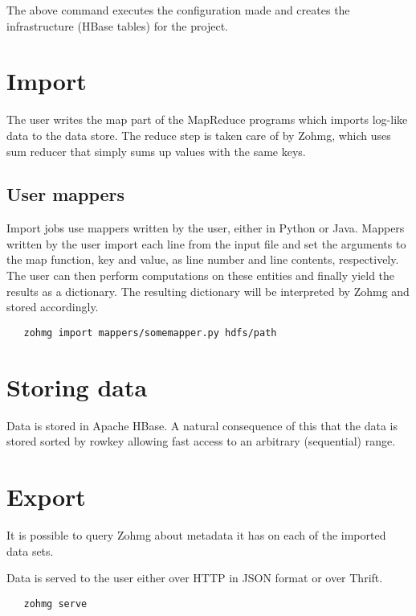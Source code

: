 \documentclass[a4paper,10pt]{book}
\begin{document}
\noindent The above command executes the configuration made and creates the
infrastructure (HBase tables) for the project.


\section{Import}

The user writes the map part of the MapReduce programs which imports
log-like data to the data store. The reduce step is taken care of by Zohmg,
which uses sum reducer that simply sums up values with the same keys.


\subsection{User mappers}

Import jobs use mappers written by the user, either in Python or Java.
Mappers written by the user import each line from the input file and set
the arguments to the map function, key and value, as line number and line
contents, respectively. The user can then perform computations on these
entities and finally yield the results as a dictionary. The resulting
dictionary will be interpreted by Zohmg and stored accordingly.

\begin{verbatim}
   zohmg import mappers/somemapper.py hdfs/path
\end{verbatim}


\section{Storing data}

Data is stored in Apache HBase. A natural consequence of this that the
data is stored sorted by rowkey allowing fast access to an arbitrary
(sequential) range.



\section{Export}

It is possible to query Zohmg about metadata it has on each of the imported
data sets.

Data is served to the user either over HTTP in JSON format or over Thrift.

\begin{verbatim}
   zohmg serve
\end{verbatim}
\end{document}
